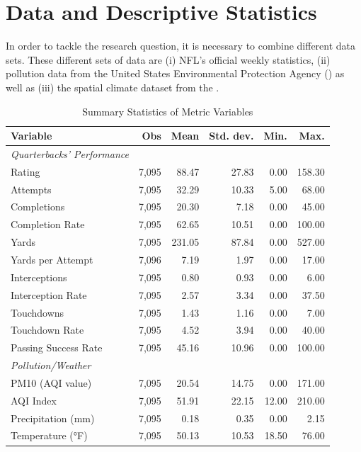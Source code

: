 \documentclass[12pt,a4paper]{article}
\begin{document}
\clearpage

\section{Data and Descriptive Statistics}
In order to tackle the research question, it is necessary to combine different data sets. These different sets of data are (i) NFL's official weekly statistics, (ii) pollution data from the United States Environmental Protection Agency (\citeauthor{EPA}) as well as (iii) the spatial climate dataset from the \citeauthor{PRISM}. 



\begin{table}[h]
  \centering
  \caption{Summary Statistics of Metric Variables}
  \label{tab:1}
  \begin{tabular}{lrrrrr}
    \hline \hline
    Variable & Obs & Mean & Std. dev. & Min. & Max. \\
    \hline
    \textit{Quarterbacks' Performance} \\
    Rating & 7,095 & 88.47 & 27.83 & 0.00 & 158.30 \\
    Attempts & 7,095 & 32.29 & 10.33 & 5.00 & 68.00 \\
    Completions & 7,095 & 20.30 & 7.18 & 0.00 & 45.00 \\
    Completion Rate & 7,095 & 62.65 & 10.51 & 0.00 & 100.00 \\
    Yards & 7,095 & 231.05 & 87.84 & 0.00 & 527.00 \\
    Yards per Attempt & 7,096 & 7.19 & 1.97 & 0.00 & 17.00 \\
    Interceptions & 7,095 & 0.80 & 0.93 & 0.00 & 6.00 \\
    Interception Rate & 7,095 & 2.57 & 3.34 & 0.00 & 37.50 \\
    Touchdowns & 7,095 & 1.43 & 1.16 & 0.00 & 7.00 \\
    Touchdown Rate & 7,095 & 4.52 & 3.94 & 0.00 & 40.00 \\
    Passing Success Rate & 7,095 & 45.16 & 10.96 & 0.00 & 100.00 \\ [0.5cm]
    \textit{Pollution/Weather} \\
    PM10 (AQI value) & 7,095 & 20.54 & 14.75 & 0.00 & 171.00 \\
    AQI Index & 7,095 & 51.91 & 22.15 & 12.00 & 210.00 \\
    Precipitation (mm) & 7,095 & 0.18 & 0.35 & 0.00 & 2.15 \\
    Temperature (°F) & 7,095 & 50.13 & 10.53 & 18.50 & 76.00 \\
    \hline \hline
  \end{tabular}
\end{table}
\end{document}
